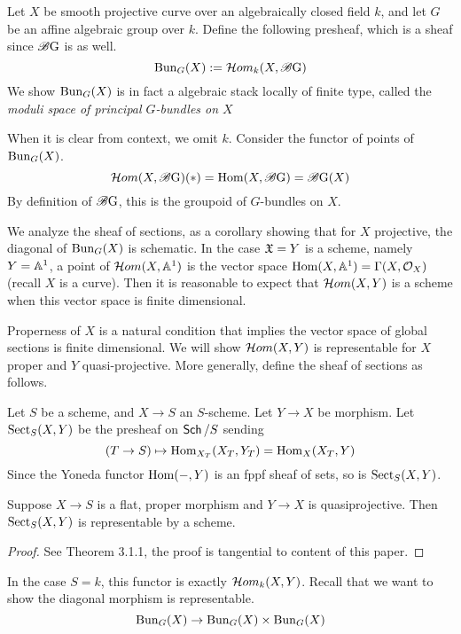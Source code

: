 \documentclass[12pt]{article}
\begin{document}
\begin{defn}
    Let $X$ be smooth projective curve over an algebraically closed field $k$, and let $G$ be an affine algebraic group over $k$. Define the following presheaf, which is a sheaf since $\operatorname{\mathscr{B} G}$ is as well.
    \[\operatorname{Bun}_G(X) := \mathcal{H} om_k(X, \operatorname{\mathscr{B} G})\]
    We show $\operatorname{Bun}_G(X)$ is in fact a algebraic stack locally of finite type, called the \textit{moduli space of principal $G$-bundles on $X$}
\end{defn}

When it is clear from context, we omit $k$. Consider the functor of points of $\operatorname{Bun}_G(X)$.
\[\mathcal{H} om(X, \operatorname{\mathscr{B} G})(*) = \operatorname{Hom}(X, \operatorname{\mathscr{B} G}) = \operatorname{\mathscr{B} G}(X)\]
By definition of $\operatorname{\mathscr{B} G}$, this is the groupoid of $G$-bundles on $X$.

We analyze the sheaf of sections, as a corollary showing that for $X$ projective, the diagonal of $\operatorname{Bun}_G(X)$ is schematic. In the case $\mathfrak{X} = Y$ is a scheme, namely $Y = \mathbb{A}^1$, a point of $\mathcal{H} om(X, \mathbb{A}^1)$ is the vector space $\operatorname{Hom}(X, \mathbb{A}^1) = \Gamma(X, \mathcal{O}_X)$ (recall $X$ is a curve). Then it is reasonable to expect that $\mathcal{H} om(X,Y)$ is a scheme when this vector space is finite dimensional.

Properness of $X$ is a natural condition that implies the vector space of global sections is finite dimensional. We will show $\mathcal{H} om(X,Y)$ is representable for $X$ proper and $Y$ quasi-projective. More generally, define the sheaf of sections as follows.

\begin{defn}
    Let $S$ be a scheme, and $X \to S$ an $S$-scheme. Let $Y \to X$ be morphism. Let $\operatorname{Sect}_S(X, Y)$ be the presheaf on $\operatorname{\mathsf{Sch}}/S$ sending
    \[(T \to S) \mapsto \operatorname{Hom}_{X_{T}}(X_{T}, Y_{T}) = \operatorname{Hom}_{X}(X_{T}, Y)\]
    Since the Yoneda functor $\operatorname{Hom}(-, Y)$ is an fppf sheaf of sets, so is $\operatorname{Sect}_S(X, Y)$.
\end{defn}

\begin{thm}\label{sectrep}
    Suppose $X \to S$ is a flat, proper morphism and $Y \to X$ is quasiprojective. Then $\operatorname{Sect}_S(X,Y)$ is representable by a scheme.
\end{thm}

\begin{proof}
    See \cite{Wang} Theorem 3.1.1, the proof is tangential to content of this paper.
\end{proof}

In the case $S = k$, this functor is exactly $\mathcal{H} om_k(X, Y)$. Recall that we want to show the diagonal morphism is representable.
\begin{equation}\label{diag}
\operatorname{Bun}_G(X) \to \operatorname{Bun}_G(X) \times \operatorname{Bun}_G(X)    
\end{equation}
\end{document}
